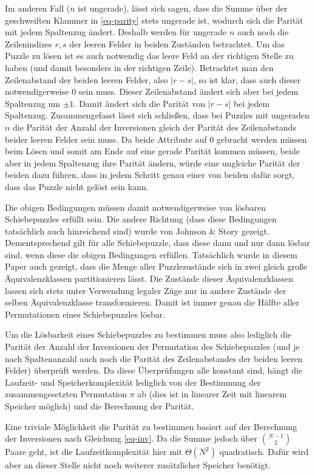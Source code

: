 \documentclass{whswinvcbook}
\begin{document}
Im anderen Fall ($n$ ist ungerade), lässt sich sagen, dass die Summe über der geschweiften Klammer in \ref{eq-parity} stets ungerade ist, wodurch sich die Parität mit jedem Spaltenzug ändert. Deshalb werden für ungerade $n$ auch noch die Zeilenindizes $r,s$ der leeren Felder in beiden Zuständen betrachtet. Um das Puzzle zu lösen ist es auch notwendig das leere Feld an der richtigen Stelle zu haben (und damit besonders in der richtigen Zeile). Betrachtet man den Zeilenabstand der beiden leeren Felder, also $|r-s|$, so ist klar, dass auch dieser notwendigerweise $0$ sein muss. Dieser Zeilenabstand ändert sich aber bei jedem Spaltenzug um $\pm1$. Damit ändert sich die Parität von $|r-s|$ bei jedem Spaltenzug. Zusammengefasst lässt sich schließen, dass bei Puzzles mit ungeraden $n$ die Parität der Anzahl der Inversionen gleich der Parität des Zeilenabstands beider leeren Felder sein muss. Da beide Attribute auf $0$ gebracht werden müssen beim Lösen und somit am Ende auf eine gerade Parität kommen müssen, beide aber in jedem Spaltenzug ihre Parität ändern, würde eine ungleiche Parität der beiden dazu führen, dass in jedem Schritt genau einer von beiden dafür sorgt, dass das Puzzle nicht gelöst sein kann.

Die obigen Bedingungen müssen damit notwendigerweise von lösbaren Schiebepuzzles erfüllt sein. Die andere Richtung (dass diese Bedingungen tatsächlich auch hinreichend sind) wurde von Johnson \& Story \cite{fift} gezeigt. Dementsprechend gilt für alle Schiebepuzzle, dass diese dann und nur dann lösbar sind, wenn diese die obigen Bedingungen erfüllen. Tatsächlich wurde in diesem Paper auch gezeigt, dass die Menge aller Puzzlezustände sich in zwei gleich große Äquivalenzklassen partitionieren lässt. Die Zustände dieser Äquivalenzklassen lassen sich stets unter Verwendung legaler Züge nur in andere Zustände der selben Äquivalenzklasse transformieren. Damit ist immer genau die Hälfte aller Permutationen eines Schiebepuzzles lösbar.

Um die Lösbarkeit eines Schiebepuzzles zu bestimmen muss also lediglich die Parität der Anzahl der Inversionen der Permutation des Schiebepuzzles (und je nach Spaltenanzahl auch noch die Parität des Zeilenabstandes der beiden leeren Felder) überprüft werden. Da diese Überprüfungen alle konstant sind, hängt die Laufzeit- und Speicherkomplexität lediglich von der Bestimmung der zusammengesetzten Permutation $\pi$ ab (dies ist in linearer Zeit mit linearem Speicher möglich) und die Berechnung der Parität.

Eine triviale Möglichkeit die Parität zu bestimmen basiert auf der Berechnung der Inversionen nach Gleichung \ref{eq-inv}. Da die Summe jedoch über $\binom{N-1}{2}$ Paare geht, ist die Laufzeitkomplexität hier mit $\Theta(N^2)$ quadratisch. Dafür wird aber an dieser Stelle nicht noch weiterer zusätzlicher Speicher benötigt.
\end{document}
